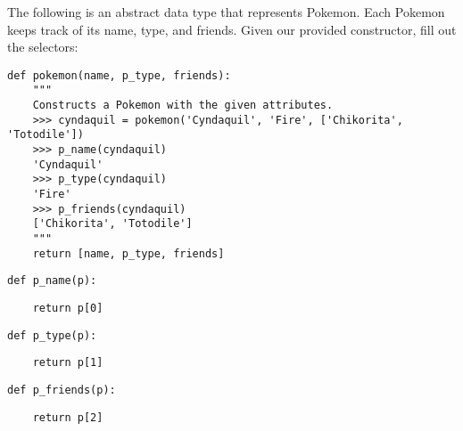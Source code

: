 \begin{blocksection}
    \question The following is an abstract data type that represents Pokemon.
    Each Pokemon keeps track of its name, type, and friends. Given
    our provided constructor, fill out the selectors:
    
\begin{lstlisting}
def pokemon(name, p_type, friends):
    """
    Constructs a Pokemon with the given attributes. 
    >>> cyndaquil = pokemon('Cyndaquil', 'Fire', ['Chikorita', 'Totodile'])
    >>> p_name(cyndaquil)
    'Cyndaquil'
    >>> p_type(cyndaquil)
    'Fire'
    >>> p_friends(cyndaquil)
    ['Chikorita', 'Totodile']
    """
    return [name, p_type, friends]

\end{lstlisting}
    
    \end{blocksection}
    \begin{blocksection}
    
    \begin{lstlisting}
def p_name(p):
    \end{lstlisting}
    \begin{solution}[0.25in]
    \begin{lstlisting}
    return p[0]
    \end{lstlisting}
    \end{solution}
    \end{blocksection}
    \begin{blocksection}
    
    \begin{lstlisting}
def p_type(p):
    \end{lstlisting}
    \begin{solution}[0.25in]
    \begin{lstlisting}
    return p[1]
    \end{lstlisting}
    \end{solution}
    \end{blocksection}
    \begin{blocksection}
    
    \begin{lstlisting}
def p_friends(p):
    \end{lstlisting}
    \begin{solution}[0.25in]
    \begin{lstlisting}
    return p[2]
    \end{lstlisting}
    \end{solution}
    \end{blocksection}
    
